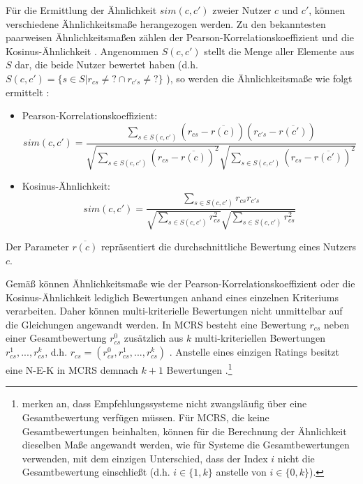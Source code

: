 Für die Ermittlung der Ähnlichkeit $sim(c,c')$ zweier Nutzer $c$ und $c'$, können verschiedene Ähnlichkeitsmaße herangezogen werden.
Zu den bekanntesten paarweisen Ähnlichkeitsmaßen zählen der Pearson-Korrelationskoeffizient und die Kosinus-Ähnlichkeit \cite[S. 856]{adomavicius:4:inbook}\cite[S. 738]{adomavicius:inproceedings}.
Angenommen $S(c,c')$ stellt die Menge aller Elemente aus $S$ dar, die beide Nutzer bewertet haben (d.h. $S(c,c')=\{s \in S | r_{cs} \neq ? \cap r_{c's} \neq ?\}$ \cite[S. 738]{adomavicius:inproceedings}), so werden die Ähnlichkeitsmaße wie folgt ermittelt \cite[S. 856]{adomavicius:4:inbook}:
\begin{itemize}
    \item Pearson-Korrelationskoeffizient:
    \begin{equation}\label{eq13}
        sim(c,c') = \frac{\underset{{s \in S(c,c')}}{\sum}(r_{cs}-\overline{r(c)})(r_{c's}-\overline{r(c')})}{\sqrt{\underset{{s \in S(c,c')}}{\sum}(r_{cs}-\overline{r(c)})^{2}}\sqrt{\underset{{s \in S(c,c')}}{\sum}(r_{cs}-\overline{r(c')})^{2}}}
    \end{equation}
    \item Kosinus-Ähnlichkeit:
    \begin{equation}\label{eq14}
        sim(c,c') = \frac{\underset{{s \in S(c,c')}}{\sum}r_{cs}r_{c's}}{\sqrt{\underset{{s \in S(c,c')}}{\sum}r_{cs}^{2}}\sqrt{\underset{{s \in S(c,c')}}{\sum}r_{cs}^{2}}}
    \end{equation}
\end{itemize}
Der Parameter $\overline{r(c)}$ repräsentiert die durchschnittliche Bewertung eines Nutzers $c$.

Gemäß \textcite[S. 856f.]{adomavicius:4:inbook} können Ähnlichkeitsmaße wie der Pearson-Korrelationskoeffizient oder die Kosinus-Ähnlichkeit lediglich Bewertungen anhand eines einzelnen Kriteriums verarbeiten.
Daher können multi-kriterielle Bewertungen nicht unmittelbar auf die Gleichungen angewandt werden.
In \ac{MCRS} besteht eine Bewertung $r_{cs}$ neben einer Gesamtbewertung $r_{cs}^{0}$ zusätzlich aus $k$ multi-kriteriellen Bewertungen $r_{cs}^{1}, ..., r_{cs}^{k}$, d.h. $r_{cs}=(r_{cs}^{0},r_{cs}^{1}, ..., r_{cs}^{k})$ \cite[S. 426]{recommenderSystems:2016}\cite[S. 857]{adomavicius:4:inbook}.
Anstelle eines einzigen Ratings besitzt eine \ac{N-E-K} in \ac{MCRS} demnach $k+1$ Bewertungen \cite[S. 857]{adomavicius:4:inbook}.\footnote{\textcite[S. 857]{adomavicius:4:inbook} merken an, dass Empfehlungssysteme nicht zwangsläufig über eine Gesamtbewertung verfügen müssen. Für \ac{MCRS}, die keine Gesamtbewertungen beinhalten, können für die Berechnung der Ähnlichkeit dieselben Maße angewandt werden, wie für Systeme die Gesamtbewertungen verwenden, mit dem einzigen Unterschied, dass der Index $i$ nicht die Gesamtbewertung einschließt (d.h. $i \in \{1,k\}$ anstelle von $i \in \{0,k\}$).}

